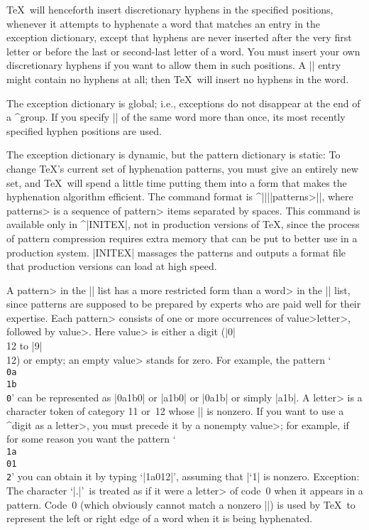 \danger \TeX\ will henceforth insert discretionary hyphens in the specified
positions, whenever it attempts to hyphenate a word that matches an entry
in the exception dictionary, except that hyphens are never inserted after the
very first letter or before the last or second-last letter of a word.
You must insert your own discretionary hyphens if you want to allow them
in such positions. A |\hyphenation| entry might contain no hyphens at all;
then \TeX\ will insert no hyphens in the word.

\danger The exception dictionary is global; i.e., exceptions do not disappear
at the end of a ^{group}. If you specify |\hyphenation| of the same word more
than once, its most recently specified hyphen positions are used.

\ddanger The exception dictionary is dynamic, but the pattern dictionary
is static: To change \TeX's current set of hyphenation patterns, you
must give an entirely new set, and \TeX\ will spend a little time putting them
into a form that makes the hyphenation algorithm efficient. The
command format is ^|\patterns||{|\<patterns>|}|, where \<patterns> is a
sequence of \<pattern> items separated by spaces. This command
is available only in ^|INITEX|, not in production versions of \TeX, since
the process of pattern compression requires extra memory that can be put
to better use in a production system. |INITEX| massages the patterns and
outputs a format file that production versions can load at high speed.

\ddanger A \<pattern> in the |\patterns| list has a more restricted form
than a \<word> in the |\hyphenation| list, since patterns are supposed to
be prepared by experts who are paid well for their expertise. Each
\<pattern> consists of one or more occurrences of \<value>\<letter>,
followed by \<value>. Here \<value> is either a digit (|0|\\{12} to |9|\\{12})
or empty; an empty \<value> stands for zero. For example, the pattern
`{\tt\\0a\\1b\\0}' can be represented as |0a1b0| or |a1b0| or |0a1b| or
simply |a1b|. A \<letter> is a character token of category 11 or~12 whose
|\lccode| is nonzero. If you want to use a ^{digit} as a \<letter>, you
must precede it by a nonempty \<value>; for example, if for some reason you
want the pattern `{\tt\\1a\\01\\2}' you can obtain it by typing
`|1a012|', assuming that |\lccode`1| is nonzero. Exception: The character
`|.|'~is treated as if it were a \<letter> of code~0
when it appears in a pattern. Code~0 (which obviously cannot match a nonzero
|\lccode|) is used by \TeX\ to represent the
left or right edge of a word when it is being hyphenated.

